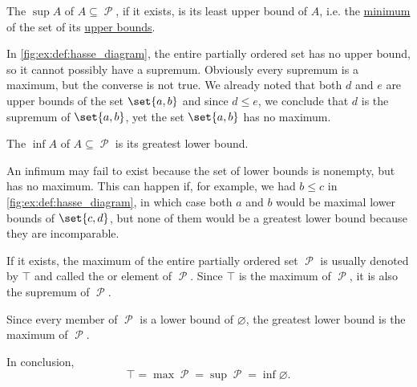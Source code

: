 \begin{definition}
\begin{thmenum}
    \begin{minipage}[t]{0.45\textwidth}
      The  \( \sup A \) of \( A \subseteq \mscrP \), if it exists, is its least upper bound of \( A \), i.e. the \hyperref[def:partially_ordered_set_extremal_points/maximum_and_minimum]{minimum} of the set of its \hyperref[def:partially_ordered_set_extremal_points/upper_and_lower_bounds]{upper bounds}.

      In \cref{fig:ex:def:hasse_diagram}, the entire partially ordered set has no upper bound, so it cannot possibly have a supremum. Obviously every supremum is a maximum, but the converse is not true. We already noted that both \( d \) and \( e \) are upper bounds of the set \( \set{ a, b } \) and since \( d \leq e \), we conclude that \( d \) is the supremum of \( \set{ a, b } \), yet the set \( \set{ a, b } \) has no maximum.
    \end{minipage}
    \hspace{0.02\textwidth}
    \begin{minipage}[t]{0.45\textwidth}
      The  \( \inf A \) of \( A \subseteq \mscrP \) is its greatest lower bound.

      An infimum may fail to exist because the set of lower bounds is nonempty, but has no maximum. This can happen if, for example, we had \( b \leq c \) in \cref{fig:ex:def:hasse_diagram}, in which case both \( a \) and \( b \) would be maximal lower bounds of \( \set{ c, d } \), but none of them would be a greatest lower bound because they are incomparable.
    \end{minipage}

    \begin{minipage}[t]{0.45\textwidth}
      If it exists, the maximum of the entire partially ordered set \( \mscrP \) is usually denoted by \( \top \) and called the  or  element of \( \mscrP \). Since \( \top \) is the maximum of \( \mscrP \), it is also the supremum of \( \mscrP \).

      Since every member of \( \mscrP \) is a lower bound of \( \varnothing \), the greatest lower bound is the maximum of \( \mscrP \).

      In conclusion,
      \begin{equation*}
        \top = \max \mscrP = \sup \mscrP = \inf \varnothing.
      \end{equation*}


\end{minipage}
\end{thmenum}
\end{definition}
